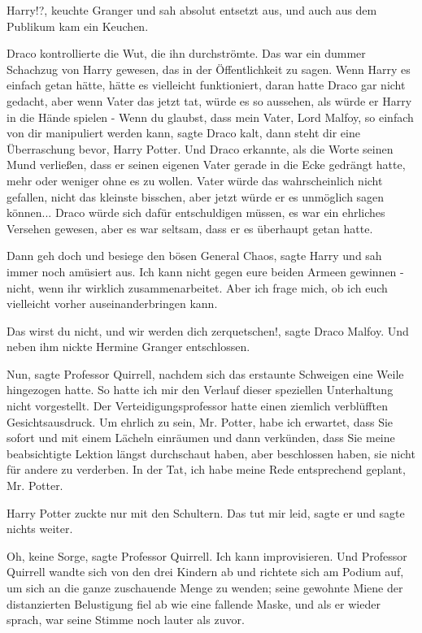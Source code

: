 \glqq{}Harry!?\grqq{}, keuchte Granger und sah absolut entsetzt aus, und auch aus
dem Publikum kam ein Keuchen.

Draco kontrollierte die Wut, die ihn durchströmte. Das war ein dummer Schachzug
von Harry gewesen, das in der Öffentlichkeit zu sagen. Wenn Harry es einfach
getan hätte, hätte es vielleicht funktioniert, daran hatte Draco gar nicht
gedacht, aber wenn Vater das jetzt tat, würde es so aussehen, als würde er Harry
in die Hände spielen - \glqq{}Wenn du glaubst, dass mein Vater, Lord Malfoy, so
einfach von dir manipuliert werden kann\grqq{}, sagte Draco kalt, \glqq{}dann
steht dir eine Überraschung bevor, Harry Potter.\grqq{} Und Draco erkannte, als die
Worte seinen Mund verließen, dass er seinen eigenen Vater gerade in die Ecke
gedrängt hatte, mehr oder weniger ohne es zu wollen. Vater würde das
wahrscheinlich nicht gefallen, nicht das kleinste bisschen, aber jetzt würde er
es unmöglich sagen können... Draco würde sich dafür entschuldigen müssen, es war
ein ehrliches Versehen gewesen, aber es war seltsam, dass er es überhaupt getan
hatte.

\glqq{}Dann geh doch und besiege den bösen General Chaos\grqq{}, sagte Harry und
sah immer noch amüsiert aus. \glqq{}Ich kann nicht gegen eure beiden Armeen
gewinnen - nicht, wenn ihr wirklich zusammenarbeitet. Aber ich frage mich, ob
ich euch vielleicht vorher auseinanderbringen kann.\grqq{}

\glqq{}Das wirst du nicht, und wir werden dich zerquetschen!\grqq{}, sagte Draco
Malfoy. Und neben ihm nickte Hermine Granger entschlossen.

\glqq{}Nun\grqq{}, sagte Professor Quirrell, nachdem sich das erstaunte Schweigen
eine Weile hingezogen hatte. \glqq{}So hatte ich mir den Verlauf dieser
speziellen Unterhaltung nicht vorgestellt.\grqq{} Der Verteidigungsprofessor hatte
einen ziemlich verblüfften Gesichtsausdruck. \glqq{}Um ehrlich zu sein, Mr.
Potter, habe ich erwartet, dass Sie sofort und mit einem Lächeln einräumen und
dann verkünden, dass Sie meine beabsichtigte Lektion längst durchschaut haben,
aber beschlossen haben, sie nicht für andere zu verderben. In der Tat, ich habe
meine Rede entsprechend geplant, Mr. Potter.\grqq{}

Harry Potter zuckte nur mit den Schultern. \glqq{}Das tut mir leid\grqq{}, sagte
er und sagte nichts weiter.

\glqq{}Oh, keine Sorge\grqq{}, sagte Professor Quirrell. \glqq{}Ich kann
improvisieren.\grqq{} Und Professor Quirrell wandte sich von den drei Kindern ab und
richtete sich am Podium auf, um sich an die ganze zuschauende Menge zu wenden;
seine gewohnte Miene der distanzierten Belustigung fiel ab wie eine fallende
Maske, und als er wieder sprach, war seine Stimme noch lauter als zuvor.

